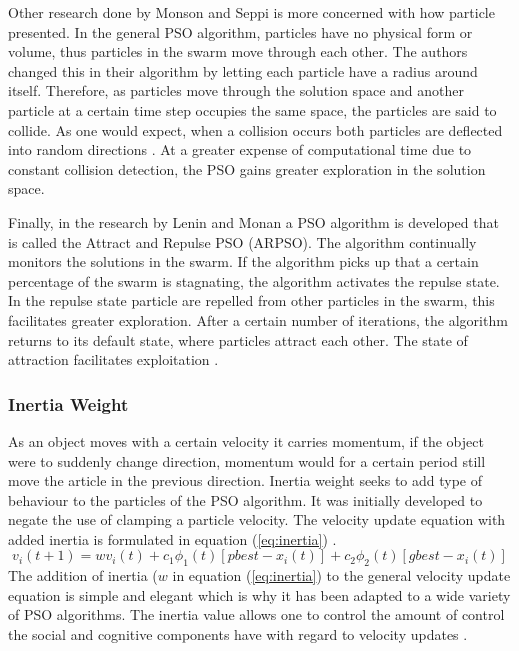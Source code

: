 Other research done by Monson and Seppi \cite{adaptPSO} is more concerned with how particle presented. In the general PSO algorithm, particles have no physical form or volume, thus particles in the swarm move through each other. The authors changed this in their algorithm by letting each particle have a radius around itself. Therefore, as particles move through the solution space and another particle at a certain time step occupies the same space, the particles are said to collide. As one would expect, when a collision occurs both particles are deflected into random directions \cite{adaptPSO}. At a greater expense of computational time due to constant collision detection, the PSO gains greater exploration in the solution space. 

Finally, in the research by Lenin and Monan a PSO algorithm is developed that is called the Attract and Repulse PSO (ARPSO). The algorithm continually monitors the solutions in the swarm. If the algorithm picks up that a certain percentage of the swarm is stagnating, the algorithm activates the repulse state. In the repulse state particle are repelled from other particles in the swarm, this facilitates greater exploration. After a certain number of iterations, the algorithm returns to its default state, where particles attract each other. The state of attraction facilitates exploitation \cite{PSOAttractRepulse}.
\subsubsection{Inertia Weight}
As an object moves with a certain velocity it carries momentum, if the object were to suddenly change direction, momentum would for a certain period still move the article in the previous direction. Inertia weight seeks to add type of behaviour to the particles of the PSO algorithm. It was initially developed to negate the use of clamping a particle velocity. The velocity update equation with added inertia is formulated in equation (\ref{eq:inertia}) \cite{FundamentalSwarm}.
\begin{equation}
v_i(t+1) = wv_i(t) + c_1\phi_{1}(t)[pbest - x_i(t)] + c_2\phi_{2}(t)[gbest - x_i(t)]\label{eq:inertia}
\end{equation}
The addition of inertia ($w$ in equation (\ref{eq:inertia}) to the general velocity update equation is simple and elegant which is why it has been adapted to a wide variety of PSO algorithms. The inertia value allows one to control the amount of control the social and cognitive components have with regard to velocity updates \cite{FundamentalSwarm}. 


